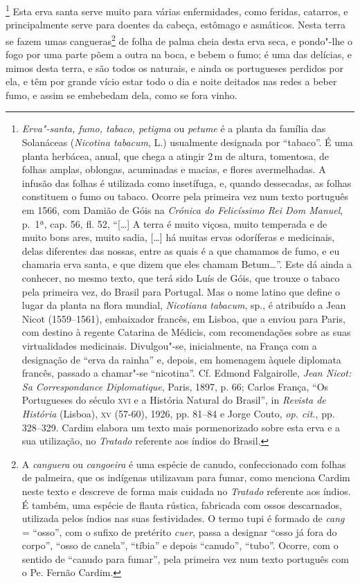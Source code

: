 \footnote{ \textit{Erva"-santa, fumo, tabaco,
petigma} ou \textit{petume} é a planta da família das Solanáceas
(\textit{Nicotina tabacum}, L.) usualmente designada por ``tabaco''. É
uma planta herbácea, anual, que chega a atingir 2\,m de altura,
tomentosa, de folhas amplas, oblongas, acuminadas e macias, e flores
avermelhadas. A infusão das folhas é utilizada como insetífuga, e,
quando dessecadas, as folhas constituem o fumo ou tabaco. Ocorre pela
primeira vez num texto português em 1566, com Damião de Góis na
\textit{Crónica do Felicíssimo Rei Dom Manuel}, p.~1ª, cap. 56, fl. 52,
``[\ldots{}] A terra é muito viçosa, muito temperada e de muito bons ares,
muito sadia, [\ldots{}] há muitas ervas odoríferas e medicinais, delas
diferentes das nossas, entre as quais é a que chamamos de fumo, e eu
chamaria erva santa, e que dizem que eles chamam Betum\ldots{}''. Este dá
ainda a conhecer, no mesmo texto, que terá sido Luís de Góis, que
trouxe o tabaco pela primeira vez, do Brasil para Portugal. Mas o
nome latino que define o lugar da planta na flora mundial,
\textit{Nicotiana tabacum}, sp., é atribuído a Jean Nicot (1559--1561), 
embaixador francês, em Lisboa, que a enviou para Paris, com destino à
regente Catarina de Médicis, com recomendações sobre as suas
virtualidades medicinais. Divulgou"-se, inicialmente, na França com a
designação de ``erva da rainha'' e, depois, em homenagem àquele diplomata
francês, passado a chamar"-se ``nicotina''. Cf. Edmond Falgairolle,
\textit{Jean Nicot: Sa Correspondance Diplomatique}, Paris, 1897, p.
66; Carlos França, ``Os Portugueses do século \textsc{xvi} e a História Natural
do Brasil'', in \textit{Revista de História} (Lisboa), \textsc{xv} (57-60),
1926, pp. 81--84 e Jorge Couto, \textit{op. cit.}, pp. 328--329. Cardim
elabora um texto mais pormenorizado sobre esta erva e a sua utilização,
no \textit{Tratado} referente aos índios do Brasil.} Esta
erva santa serve muito para várias enfermidades, como feridas,
catarros, e principalmente serve para doentes da cabeça, estômago e
asmáticos. Nesta terra se fazem umas cangueras\footnote{ A
\textit{canguera} ou \textit{cangoeira} é uma espécie de canudo,
confeccionado com folhas de palmeira, que os indígenas utilizavam para
fumar, como menciona Cardim neste texto e descreve de forma mais
cuidada no \textit{Tratado} referente aos índios. É também, uma espécie
de flauta rústica, fabricada com ossos descarnados, utilizada pelos
índios nas suas festividades. O termo tupi é formado de \textit{cang} =
``osso'', com o sufixo de pretérito \textit{cuer}, passa a designar ``osso
já fora do corpo'', ``osso de canela'', ``tíbia'' e depois ``canudo'', ``tubo''.
Ocorre, com o sentido de ``canudo para fumar'', pela primeira vez num
texto português com o Pe. Fernão Cardim.} de folha de palma cheia desta
erva seca, e pondo"-lhe o fogo por uma parte põem a outra na boca, e
bebem o fumo; é uma das delícias, e mimos desta terra, e são todos os
naturais, e ainda os portugueses perdidos por ela, e têm por grande
vício estar todo o dia e noite deitados nas redes a beber fumo, e assim
se embebedam dela, como se fora vinho. 

